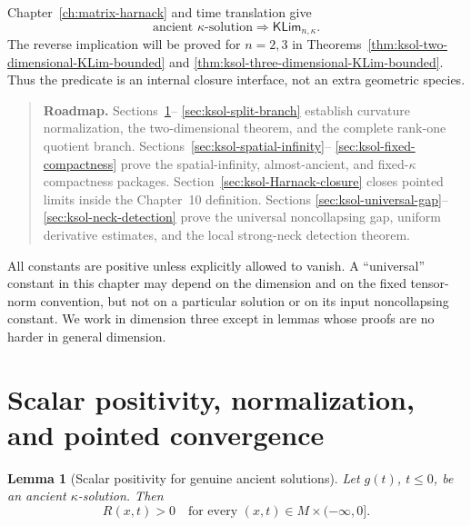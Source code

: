 \documentclass[10pt]{coll-l}
\newenvironment{roadmap}[1]{%
  \begin{quote}\small\noindent\textbf{Roadmap.} #1\par\medskip\noindent
}{\end{quote}}
\newtheorem{lemma}[theorem]{Lemma}
\theoremstyle{definition}
\theoremstyle{remark}
\numberwithin{section}{chapter}
\numberwithin{equation}{chapter}
\begin{document}
Chapter~\ref{ch:matrix-harnack} and time translation give
\begin{equation}
 \text{ancient $\kappa$-solution}
       \Longrightarrow\mathsf{KLim}_{n,\kappa}.
                                                               \label{eq:ksol-standard-to-KLim}
\end{equation}
The reverse implication will be proved for $n=2,3$ in
Theorems~\ref{thm:ksol-two-dimensional-KLim-bounded} and
\ref{thm:ksol-three-dimensional-KLim-bounded}.  Thus the predicate is an
internal closure interface, not an extra geometric species.

\begin{roadmap}{Sections~\ref{sec:ksol-normalization}--
\ref{sec:ksol-split-branch} establish curvature normalization, the
two-dimensional theorem, and the complete rank-one quotient branch.
Sections~\ref{sec:ksol-spatial-infinity}--
\ref{sec:ksol-fixed-compactness} prove the spatial-infinity, almost-ancient,
and fixed-$\kappa$ compactness packages.  Section~\ref{sec:ksol-Harnack-closure}
closes pointed limits inside the Chapter~10 definition.  Sections
\ref{sec:ksol-universal-gap}--\ref{sec:ksol-neck-detection} prove the
universal noncollapsing gap, uniform derivative estimates, and the local
strong-neck detection theorem.}
\end{roadmap}

All constants are positive unless explicitly allowed to vanish.  A
``universal'' constant in this chapter may depend on the dimension and on
the fixed tensor-norm convention, but not on a particular solution or on
its input noncollapsing constant.  We work in dimension three except in
lemmas whose proofs are no harder in general dimension.

\section{Scalar positivity, normalization, and pointed convergence}
\label{sec:ksol-normalization}

\begin{lemma}[Scalar positivity for genuine ancient solutions]
\label{lem:ksol-scalar-positive}
Let $g(t)$, $t\leq0$, be an ancient $\kappa$-solution.  Then
\begin{equation}
                         R(x,t)>0
       \quad\text{for every }(x,t)\in M\times(-\infty,0].       \label{eq:ksol-R-positive}
\end{equation}
\end{lemma}
\end{document}
